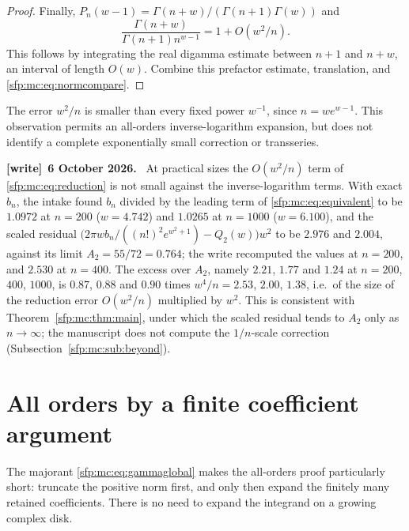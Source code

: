 \documentclass[11pt,letterpaper]{article}
\numberwithin{equation}{section}
\theoremstyle{definition}\newtheorem{definition}[theorem]{Definition}
\theoremstyle{remark}\newtheorem{remark}[theorem]{Remark}
\newenvironment{writenote}[1][]{\par\smallskip\begingroup\small
 \noindent\textbf{[write]}\if\relax\detokenize{#1}\relax\else~\textbf{#1.}\fi\ }%
 {\par\endgroup\smallskip}
\begin{document}
\begin{proof}
Finally,
$P_n(w-1)=\Gamma(n+w)/(\Gamma(n+1)\Gamma(w))$ and
\[
 \frac{\Gamma(n+w)}{\Gamma(n+1)n^{w-1}}
       =1+O(w^2/n).
\]
This follows by integrating the real digamma estimate between
$n+1$ and $n+w$, an interval of length $O(w)$.
Combine this prefactor estimate, translation, and
\eqref{sfp:mc:eq:normcompare}.
\end{proof}

The error $w^2/n$ is smaller than every fixed power $w^{-1}$,
since $n=we^{w-1}$. This observation permits an all-orders
inverse-logarithm expansion, but does not identify a complete
exponentially small correction or transseries.
\begin{writenote}[6 October 2026]
At practical sizes the $O(w^2/n)$ term of \eqref{sfp:mc:eq:reduction} is not small against the inverse-logarithm terms. With exact $b_n$, the intake found $b_n$ divided by the leading term of \eqref{sfp:mc:eq:equivalent} to be $1.0972$ at $n=200$ ($w=4.742$) and $1.0265$ at $n=1000$ ($w=6.100$), and the scaled residual $\bigl(2\pi wb_n/((n!)^2e^{w^2+1})-Q_2(w)\bigr)w^2$ to be $2.976$ and $2.004$, against its limit $A_2=55/72=0.764$; the write recomputed the values at $n=200$, and $2.530$ at $n=400$. The excess over $A_2$, namely $2.21$, $1.77$ and $1.24$ at $n=200$, $400$, $1000$, is $0.87$, $0.88$ and $0.90$ times $w^4/n=2.53$, $2.00$, $1.38$, i.e.\ of the size of the reduction error $O(w^2/n)$ multiplied by $w^2$. This is consistent with Theorem~\ref{sfp:mc:thm:main}, under which the scaled residual tends to $A_2$ only as $n\to\infty$; the manuscript does not compute the $1/n$-scale correction (Subsection~\ref{sfp:mc:sub:beyond}).
\end{writenote}

\section{All orders by a finite coefficient argument}
\label{sfp:mc:sec:allorders}

The majorant \eqref{sfp:mc:eq:gammaglobal} makes the all-orders proof
particularly short: truncate the positive norm first, and only
then expand the finitely many retained coefficients. There is no
need to expand the integrand on a growing complex disk.
\end{document}
